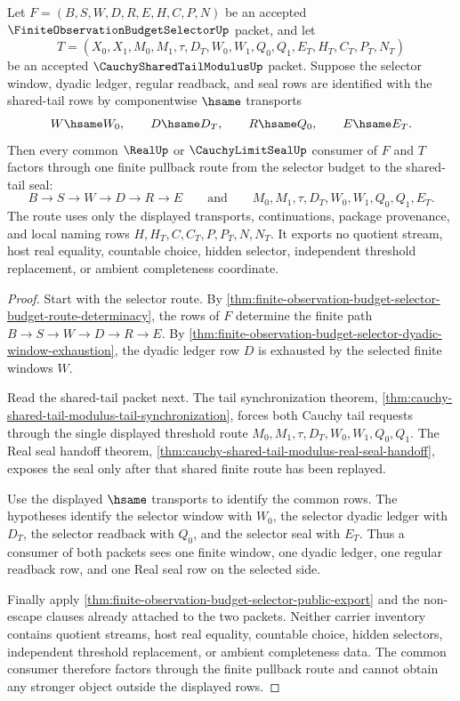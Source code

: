 \begin{theorem}
\label{thm:finite-observation-budget-selector-shared-tail-modulus-pullback}
Let $F=(B,S,W,D,R,E,H,C,P,N)$ be an accepted $\FiniteObservationBudgetSelectorUp$ packet, and let
$$
T=(X_0,X_1,M_0,M_1,\tau,D_T,W_0,W_1,Q_0,Q_1,E_T,H_T,C_T,P_T,N_T)
$$
be an accepted $\CauchySharedTailModulusUp$ packet. Suppose the selector window, dyadic ledger, regular readback, and seal rows are identified with the shared-tail rows by componentwise $\hsame$ transports
$$
W \hsame W_0,\qquad
D \hsame D_T,\qquad
R \hsame Q_0,\qquad
E \hsame E_T.
$$
Then every common $\RealUp$ or $\CauchyLimitSealUp$ consumer of $F$ and $T$ factors through one finite pullback route from the selector budget to the shared-tail seal:
$$
B \to S \to W \to D \to R \to E
\qquad\text{and}\qquad
M_0,M_1,\tau,D_T,W_0,W_1,Q_0,Q_1,E_T.
$$
The route uses only the displayed transports, continuations, package provenance, and local naming rows $H,H_T,C,C_T,P,P_T,N,N_T$. It exports no quotient stream, host real equality, countable choice, hidden selector, independent threshold replacement, or ambient completeness coordinate.
\end{theorem}
\begin{proof}
Start with the selector route. By \autoref{thm:finite-observation-budget-selector-budget-route-determinacy}, the rows of $F$ determine the finite path $B \to S \to W \to D \to R \to E$. By \autoref{thm:finite-observation-budget-selector-dyadic-window-exhaustion}, the dyadic ledger row $D$ is exhausted by the selected finite windows $W$.

Read the shared-tail packet next. The tail synchronization theorem, \autoref{thm:cauchy-shared-tail-modulus-tail-synchronization}, forces both Cauchy tail requests through the single displayed threshold route $M_0,M_1,\tau,D_T,W_0,W_1,Q_0,Q_1$. The Real seal handoff theorem, \autoref{thm:cauchy-shared-tail-modulus-real-seal-handoff}, exposes the seal only after that shared finite route has been replayed.

Use the displayed $\hsame$ transports to identify the common rows. The hypotheses identify the selector window with $W_0$, the selector dyadic ledger with $D_T$, the selector readback with $Q_0$, and the selector seal with $E_T$. Thus a consumer of both packets sees one finite window, one dyadic ledger, one regular readback row, and one Real seal row on the selected side.

Finally apply \autoref{thm:finite-observation-budget-selector-public-export} and the non-escape clauses already attached to the two packets. Neither carrier inventory contains quotient streams, host real equality, countable choice, hidden selectors, independent threshold replacement, or ambient completeness data. The common consumer therefore factors through the finite pullback route and cannot obtain any stronger object outside the displayed rows.
\end{proof}


